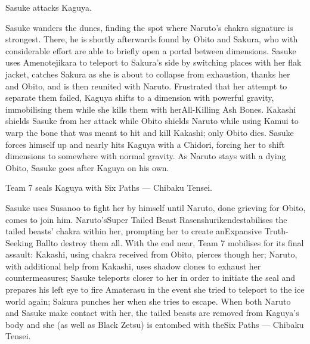 \documentclass[a4paper,12pt]{article}
\begin{document}
Sasuke attacks Kaguya.\\ \par \vspace{0.5cm}

Sasuke wanders the dunes, finding the spot where Naruto's chakra signature is strongest. There, he is shortly afterwards found by Obito and Sakura, who with considerable effort are able to briefly open a portal between dimensions. Sasuke uses Amenotejikara to teleport to Sakura's side by switching places with her flak jacket, catches Sakura as she is about to collapse from exhaustion, thanks her and Obito, and is then reunited with Naruto. Frustrated that her attempt to separate them failed, Kaguya shifts to a dimension with powerful gravity, immobilising them while she kills them with herAll-Killing Ash Bones. Kakashi shields Sasuke from her attack while Obito shields Naruto while using Kamui to warp the bone that was meant to hit and kill Kakashi; only Obito dies. Sasuke forces himself up and nearly hits Kaguya with a Chidori, forcing her to shift dimensions to somewhere with normal gravity. As Naruto stays with a dying Obito, Sasuke goes after Kaguya on his own.\\ \par \vspace{0.5cm}

Team 7 seals Kaguya with Six Paths — Chibaku Tensei.\\ \par \vspace{0.5cm}

Sasuke uses Susanoo to fight her by himself until Naruto, done grieving for Obito, comes to join him. Naruto'sSuper Tailed Beast Rasenshurikendestabilises the tailed beasts' chakra within her, prompting her to create anExpansive Truth-Seeking Ballto destroy them all. With the end near, Team 7 mobilises for its final assault: Kakashi, using chakra received from Obito, pierces though her; Naruto, with additional help from Kakashi, uses shadow clones to exhaust her countermeasures; Sasuke teleports closer to her in order to initiate the seal and prepares his left eye to fire Amaterasu in the event she tried to teleport to the ice world again; Sakura punches her when she tries to escape. When both Naruto and Sasuke make contact with her, the tailed beasts are removed from Kaguya's body and she (as well as Black Zetsu) is entombed with theSix Paths — Chibaku Tensei.\\ \par \vspace{0.5cm}
\end{document}
